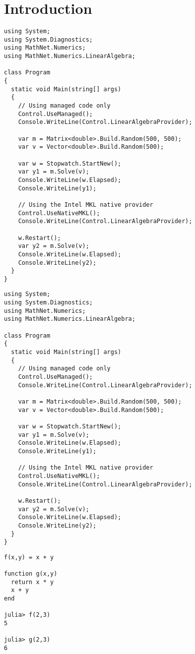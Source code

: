 \chapter{Introduction}
\lipsum[1]

\begin{verbatim}
using System;
using System.Diagnostics;
using MathNet.Numerics;
using MathNet.Numerics.LinearAlgebra;

class Program
{
  static void Main(string[] args)
  {
    // Using managed code only
    Control.UseManaged();
    Console.WriteLine(Control.LinearAlgebraProvider);

    var m = Matrix<double>.Build.Random(500, 500);
    var v = Vector<double>.Build.Random(500);

    var w = Stopwatch.StartNew();
    var y1 = m.Solve(v);
    Console.WriteLine(w.Elapsed);
    Console.WriteLine(y1);

    // Using the Intel MKL native provider
    Control.UseNativeMKL();
    Console.WriteLine(Control.LinearAlgebraProvider);

    w.Restart();
    var y2 = m.Solve(v);
    Console.WriteLine(w.Elapsed);
    Console.WriteLine(y2);
  }
}
\end{verbatim}

\begin{verbatim}
using System;
using System.Diagnostics;
using MathNet.Numerics;
using MathNet.Numerics.LinearAlgebra;

class Program
{
  static void Main(string[] args)
  {
    // Using managed code only
    Control.UseManaged();
    Console.WriteLine(Control.LinearAlgebraProvider);

    var m = Matrix<double>.Build.Random(500, 500);
    var v = Vector<double>.Build.Random(500);

    var w = Stopwatch.StartNew();
    var y1 = m.Solve(v);
    Console.WriteLine(w.Elapsed);
    Console.WriteLine(y1);

    // Using the Intel MKL native provider
    Control.UseNativeMKL();
    Console.WriteLine(Control.LinearAlgebraProvider);

    w.Restart();
    var y2 = m.Solve(v);
    Console.WriteLine(w.Elapsed);
    Console.WriteLine(y2);
  }
}
\end{verbatim}


\begin{verbatim}
f(x,y) = x + y

function g(x,y)
  return x * y
  x + y
end

julia> f(2,3)
5

julia> g(2,3)
6
\end{verbatim}





